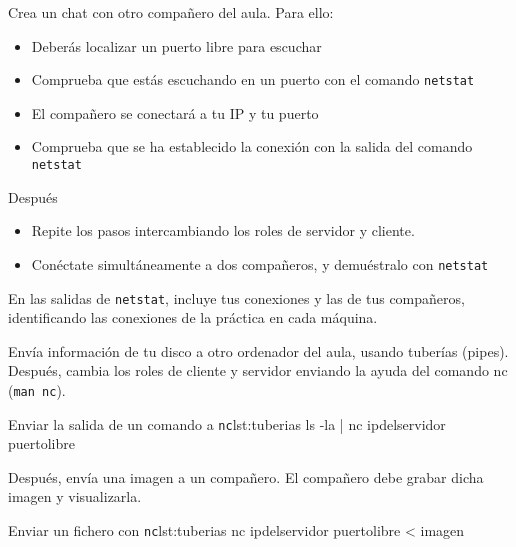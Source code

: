 \begin{homeworkProblem}
  Crea un chat con otro compañero del aula. Para ello:
  \begin{itemize}
  \item Deberás localizar un puerto libre para escuchar
  \item Comprueba que estás escuchando en un puerto con el comando \texttt{netstat}
  \item El compañero se conectará a tu IP y tu puerto
  \item Comprueba que se ha establecido la conexión con la salida del comando \texttt{netstat}
  \end{itemize}

  Después
  \begin{itemize}
  \item Repite los pasos intercambiando los roles de servidor y cliente.
  \item Conéctate simultáneamente a dos compañeros, y demuéstralo con \texttt{netstat}
  \end{itemize}

  En las salidas de \texttt{netstat}, incluye tus conexiones y las de tus compañeros, identificando las conexiones de la práctica en cada máquina.
\end{homeworkProblem}


\begin{homeworkProblem}
  Envía información de tu disco a otro ordenador del aula, usando tuberías (pipes). Después, cambia los roles de cliente y servidor enviando la ayuda del comando nc (\texttt{man nc}).

  
  \begin{listadoshell}{Enviar la salida de un comando a \texttt{nc}}{lst:tuberias}
    ls -la | nc ipdelservidor puertolibre
  \end{listadoshell}

  Después, envía una imagen a un compañero. El compañero debe grabar dicha imagen y visualizarla.

  \begin{listadoshell}{Enviar un fichero con \texttt{nc}}{lst:tuberias}
    nc ipdelservidor puertolibre < imagen
  \end{listadoshell}
\end{homeworkProblem}


